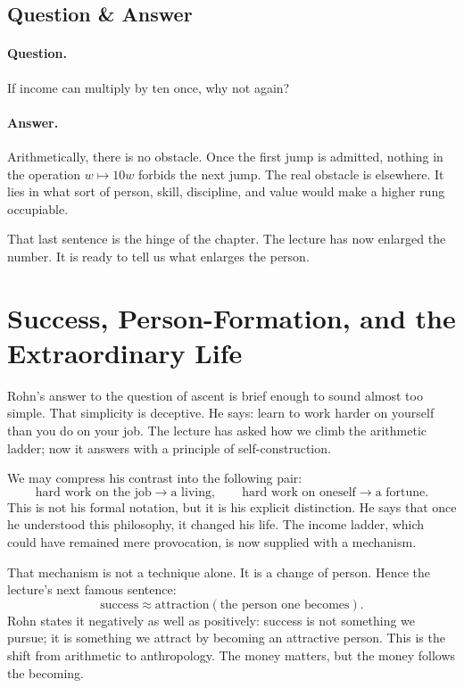 \subsection{Question \& Answer}

\paragraph{Question.} If income can multiply by ten once, why not again?

\paragraph{Answer.} Arithmetically, there is no obstacle. Once the first jump is admitted, nothing in the operation \(w\mapsto 10w\) forbids the next jump. The real obstacle is elsewhere. It lies in what sort of person, skill, discipline, and value would make a higher rung occupiable.

That last sentence is the hinge of the chapter. The lecture has now enlarged the number. It is ready to tell us what enlarges the person.

\section{Success, Person-Formation, and the Extraordinary Life}

Rohn's answer to the question of ascent is brief enough to sound almost too simple. That simplicity is deceptive. He says: learn to work harder on yourself than you do on your job. The lecture has asked how we climb the arithmetic ladder; now it answers with a principle of self-construction.

We may compress his contrast into the following pair:
\begin{equation}
\text{hard work on the job} \to \text{a living}, \qquad
\text{hard work on oneself} \to \text{a fortune}.
\end{equation}
This is not his formal notation, but it is his explicit distinction. He says that once he understood this philosophy, it changed his life. The income ladder, which could have remained mere provocation, is now supplied with a mechanism.

That mechanism is not a technique alone. It is a change of person. Hence the lecture's next famous sentence:
\begin{equation}
\text{success} \approx \text{attraction}(\text{the person one becomes}).
\end{equation}
Rohn states it negatively as well as positively: success is not something we pursue; it is something we attract by becoming an attractive person. This is the shift from arithmetic to anthropology. The money matters, but the money follows the becoming.

